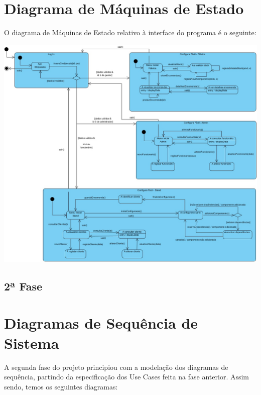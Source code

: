 \documentclass[11pt]{article} %
\begin{document}
\section{Diagrama de Máquinas de Estado}
O diagrama de Máquinas de Estado relativo à interface do programa é o seguinte:
	\begin{center}
		\includegraphics[width = 6in]{Maquina_de_Estado.jpg}
	\end{center}
	
\newpage

\begin{center}
\section*{2ª Fase}
\end{center}

\section{Diagramas de Sequência de Sistema}
A segunda fase do projeto principiou com a modelação dos diagramas de sequência, partindo da especificação dos Use Cases feita na fase anterior. Assim sendo, temos os seguintes diagramas:
\end{document}
